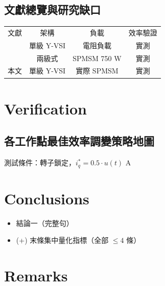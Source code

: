 \documentclass{article}
\begin{document}
\subsection{文獻總覽與研究缺口}
\begin{tabular}{lccc}
文獻 & 架構 & 負載 & 效率驗證 \\
[4] & 單級 Y-VSI & 電阻負載 & 實測 \\
[11] & 兩級式 & SPMSM 750 W & 實測 \\
本文 & 單級 Y-VSI & 實際 SPMSM & 實測 \\
\end{tabular}
%

\section{Verification}
\subsection{各工作點最佳效率調變策略地圖}
測試條件：轉子鎖定，$i_q^* = 0.5 \cdot u(t)$ A
%

\section{Conclusions}
\begin{itemize}
\item 結論一（完整句）
\item (+) 末條集中量化指標（全部 $\le 4$ 條）
\end{itemize}

\section{Remarks}

\end{document}
